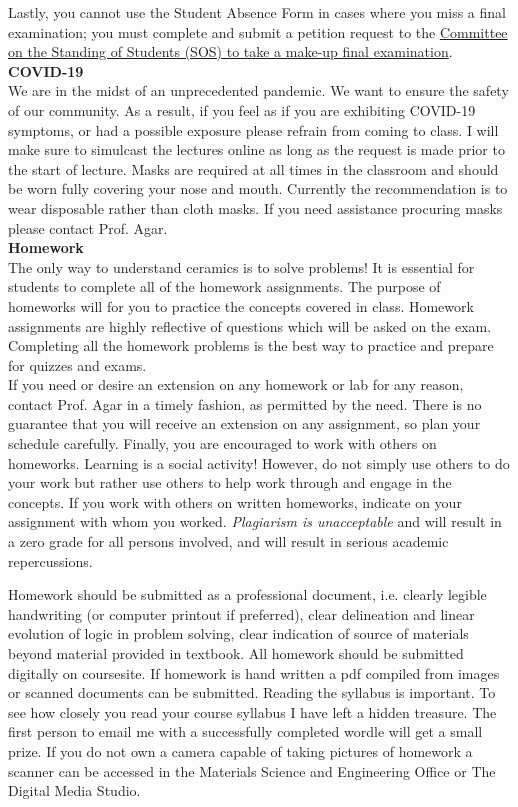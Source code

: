 \documentclass[11pt,letterpaper]{article}
\newcommand{\lefthead}[2]{\noindent\textbf{#1}\hfill\\[#2]}
\begin{document}
Lastly, you cannot use the Student Absence Form in cases where you miss a final examination; you must complete and submit a petition request to the \href{https://studentaffairs.lehigh.edu/content/committee-standing-students}{Committee on the Standing of Students (SOS) to take a make-up final examination}. \\[0.3cm]

\lefthead{COVID-19}{0.3cm}
We are in the midst of an unprecedented pandemic. 
We want to ensure the safety of our community.
As a result, if you feel as if you are exhibiting COVID-19 symptoms, or had a possible exposure please refrain from coming to class.
I will make sure to simulcast the lectures online as long as the request is made prior to the start of lecture.
Masks are required at all times in the classroom and should be worn fully covering your nose and mouth.
Currently the recommendation is to wear disposable rather than cloth masks.
If you need assistance procuring masks please contact Prof. Agar.
\\[0.3cm]

\lefthead{Homework}{0.3cm}
\noindent The only way to understand ceramics is to solve problems! It is essential for students to complete all of the homework assignments. The purpose of homeworks will for you to practice the concepts covered in class. Homework assignments are highly reflective of questions which will be asked on the exam. Completing all the homework problems is the best way to practice and prepare for quizzes and exams. \\
If you need or desire an extension on any homework or lab for any reason, contact Prof. Agar in a timely fashion, as permitted by the need. There is no guarantee that you will receive an extension on any assignment, so plan your schedule carefully. Finally, you are encouraged to work with others on homeworks. Learning is a social activity! However, do not simply use others to do your work but rather use others to help work through and engage in the concepts. If you work with others on written homeworks, indicate on your assignment with whom you worked. \emph{Plagiarism is unacceptable} and will result in a zero grade for all persons involved, and will result in serious academic repercussions. 

Homework should be submitted as a professional document, i.e. clearly legible handwriting (or computer printout if preferred), clear delineation and linear evolution of logic in problem solving,
clear indication of source of materials beyond material provided in textbook.
All homework should be submitted digitally on coursesite. 
If homework is hand written a pdf compiled from images or scanned documents can be submitted. 
Reading the syllabus is important. To see how closely you read your course syllabus I have left a hidden treasure. The first person to email me with a successfully completed wordle will get a small prize.
If you do not own a camera capable of taking pictures of homework a scanner can be accessed in the Materials Science and Engineering Office or The Digital Media Studio.
\end{document}
